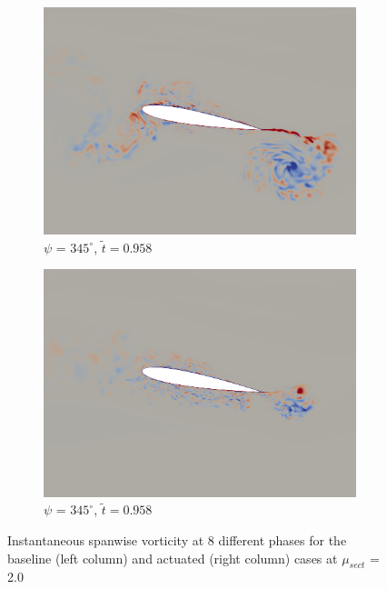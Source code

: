 \begin{figure}[H]
	\begin{subfigure}[b]{0.4\textwidth}
		\centering
		\includegraphics[width=1\textwidth]{figures/mu_2pt0/vorticity/baseline/phase_345.png}
		\caption{ $\psi$ = $345^\circ$, $\tilde{t}=0.958$}
		\label{fig:mu_2pt0_baseline_psi345}
	\end{subfigure}
	\begin{subfigure}[b]{0.4\textwidth}
		\centering
		\includegraphics[width=1\textwidth]{figures/mu_2pt0/vorticity/AC/phase_345.png}
		\caption{ $\psi$ = $345^\circ$, $\tilde{t}=0.958$}
		\label{fig:mu_2pt0_AC_psi345}
	\end{subfigure}
	
	
	
	\caption{Instantaneous spanwise vorticity at 8 different phases for the baseline (left column) and actuated (right column) cases at $\mu_{sect}$ = 2.0}
	\label{fig:vortScreen_mu2pt0}
\end{figure}

